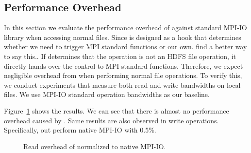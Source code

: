 \subsection{Performance Overhead}
In this section we evaluate the performance overhead of {\proj} against standard
MPI-IO library when accessing normal files. Since {\proj} is designed as a hook
that determines whether we need to trigger MPI standard functions or our own.
{\color{red} find a better way to say this..} If {\proj} determines that the
operation is not an HDFS file operation, it directly hands over the control to
MPI standard functions. Therefore, we expect negligible
overhead from {\proj} when performing normal file operations. To verify this, we
conduct experiments that measure both read and write bandwidths on local files. We use MPI-IO
standard operation bandwidths as our baseline. 

Figure~\ref{fig:over} shows the results. We can see that there is almost no
performance overhead caused by {\proj}. Same results are also observed in write
operations. Specifically, {\proj} out perform native MPI-IO with 0.5\%.

\begin{figure}[t]
\begin{center}
\caption{\small Read overhead of {\proj} normalized to native MPI-IO.}
\label{fig:over}
\vspace{-6pt}
\end{center}
\end{figure}
